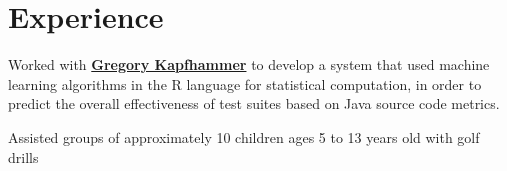 \documentclass[]{brandon_ginoza_resume}
\begin{document}
\begin{minipage}[t]{0.66\textwidth}


\section{Experience}

Worked with \textbf{\href{http://www.cs.allegheny.edu/sites/gkapfham/}{Gregory Kapfhammer}} to develop a system that used machine learning 
algorithms in the R language for statistical computation, in order to predict the overall effectiveness of test suites based on Java source 
code metrics. 





\sectionsep

Assisted groups of approximately 10 children ages 5 to 13 years old with golf drills
\sectionsep


\end{minipage}
\end{document}
